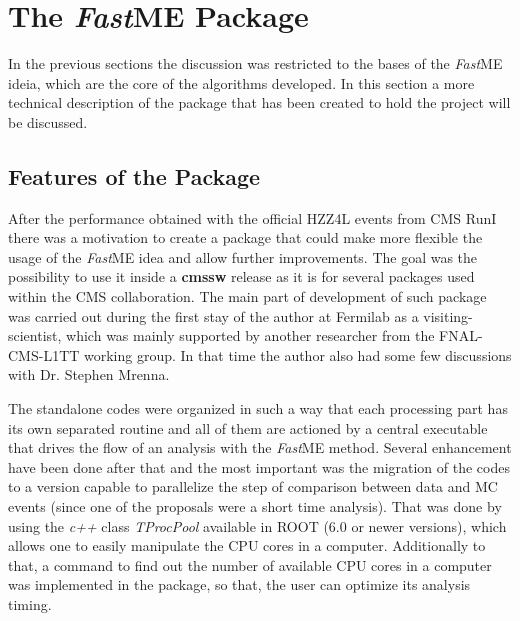 \section{The \textit{Fast}ME Package}
In the previous sections the discussion was restricted to the bases of the \textit{Fast}ME ideia, which are the core of the algorithms developed. In this section a more technical description of the package that has been created to hold the project will be discussed.

\subsection{Features of the Package}
After the performance obtained with the official HZZ4L events from CMS RunI there was a motivation to create a package that could make more flexible the usage of the \textit{Fast}ME idea and allow further improvements. The goal was the possibility to use it inside a \textbf{cmssw} release as it is for several packages used within the CMS collaboration. The main part of development of such package was carried out during the first stay of the author at Fermilab as a visiting-scientist, which was mainly supported by another researcher from the FNAL-CMS-L1TT working group. In that time the author also had some few discussions with Dr. Stephen Mrenna. 

The standalone codes were organized in such a way that each processing part has its own separated routine and all of them are actioned by a central executable that drives the flow of an analysis with the \textit{Fast}ME method. Several enhancement have been done after that and the most important was the migration of the codes to a version capable to parallelize the step of comparison between data and MC events (since one of the proposals were a short time analysis). That was done by using the \textit{c++} class \textit{TProcPool} available in ROOT (6.0 or newer versions), which allows one to easily manipulate the CPU cores in a computer. Additionally to that, a command to find out the number of available CPU cores in a computer was implemented in the package, so that, the user can optimize its analysis timing.

